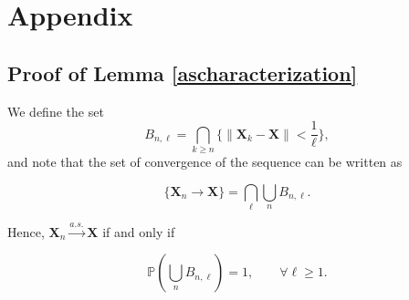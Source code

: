 \documentclass[11pt] {article}
\newcommand{\norm}[1]{\left\lVert#1\right\rVert}
\newcommand{\X}{\pmb{X}}
\newcommand{\x}{\pmb{x}}
\newcommand{\I}{\pmb{I}}
\newcommand{\Expectation}{\mathbb{E}}
\newcommand{\convas}{\overset{a.s.}{\longrightarrow}}
\newcommand{\T}{\mathsf{T}}
\begin{document}
%
%
%
%
%
%
%


\section*{Appendix}

\subsection*{Proof of Lemma \ref{ascharacterization}}
We define the set 
\begin{equation*}
B_{n,\ell} = \bigcap_{k\geq n}\{\norm{\X_k-\X}<\frac{1}{\ell}\},
\end{equation*}
and note that the set of convergence of the sequence can be written as 

\begin{equation*}
\{\X_n \to \X\} = \bigcap_{\ell}\bigcup_{n}B_{n,\ell}.
\end{equation*}

Hence, $\X_n \convas \X$ if and only if

\begin{equation*}
\mathbb{P}\left(\bigcup_n B_{n,\ell}\right) = 1,\qquad \forall \ell \geq 1.
\end{equation*}
\end{document}
